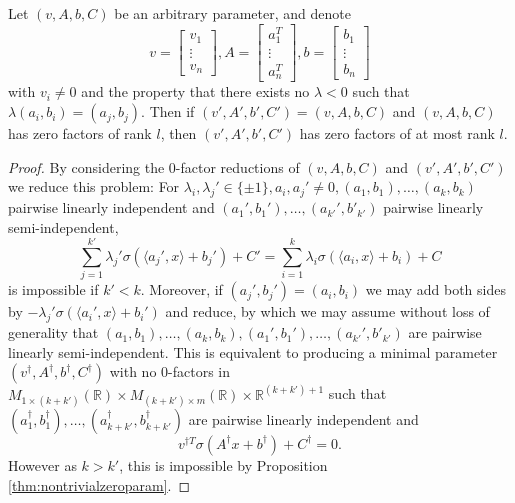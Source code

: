 \documentclass[11pt,letterpaper]{amsart}
\begin{document}
\begin{corollary}\label{cor:minranklinind}
    Let $(v, A, b, C)$ be an arbitrary parameter, and denote
    $$
    v = \begin{bmatrix}
        v_1 \\ \vdots\\ v_n
    \end{bmatrix}, A = \begin{bmatrix}
        a_1^T\\ \vdots\\ a_n^T
    \end{bmatrix}, b = \begin{bmatrix}
        b_1 \\ \vdots\\ b_n
    \end{bmatrix}
    $$
    with $v_i\neq 0$ and the property that there exists no $\lambda<0$ such that $\lambda (a_i, b_i) = (a_j, b_j)$. Then if $(v', A', b', C')=(v, A, b, C)$ and $(v, A, b, C)$ has zero factors of rank $l$, then $(v', A', b', C')$ has zero factors of at most rank $l$. 
\end{corollary}
\begin{proof}
    \par By considering the 0-factor reductions of $(v, A, b, C)$ and $ (v', A', b', C')$ we reduce this problem: For $\lambda_i, \lambda_j'\in \{\pm 1\}, a_i, a_j'\neq 0 , (a_1, b_1), \ldots, (a_k, b_k)$ pairwise linearly independent and $(a_1', b_1'), \ldots, (a_{k'}', b'_{k'})$ pairwise linearly semi-independent,
    $$
    \sum_{j=1}^{k'} \lambda_j'\sigma (\langle a_j', x\rangle + b_j') + C' = \sum_{i=1}^{k} \lambda_i\sigma (\langle a_i, x\rangle + b_i) + C
    $$
    is impossible if $k'<k$. Moreover, if $(a_j', b_j')=(a_i, b_i)$ we may add both sides by $-\lambda_j'\sigma(\langle a_i', x\rangle+b_i')$ and reduce, by which we may assume without loss of generality that  $(a_1, b_1), \ldots, (a_k, b_k), (a_1', b_1'), \ldots, (a_{k'}', b'_{k'})$ are pairwise linearly semi-independent. This is equivalent to producing a minimal parameter $(v^\dagger, A^\dagger, b^\dagger, C^\dagger)$ with no $0$-factors in $M_{1\times (k+k')}(\mathbb{R})\times M_{(k+k')\times m}(\mathbb{R})\times\mathbb{R}^{(k+k')+1}$ such that $(a_1^\dagger, b_1^\dagger), \ldots, (a_{k+k'}^\dagger, b_{k+k'}^\dagger)$ are pairwise linearly independent and 
    $$
    v^{\dagger T}\sigma (A^\dagger x +b^\dagger)+ C^\dagger = 0.
    $$
    However as $k>k'$, this is impossible by Proposition \ref{thm:nontrivialzeroparam}. 
\end{proof}
\end{document}
